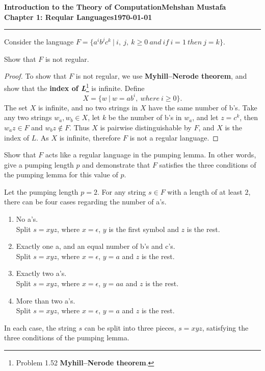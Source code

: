 \documentclass[11pt]{article}
\newcommand{\myname}{Mehshan Mustafa}
\newcommand{\dated}{\today}
\newenvironment{problem}[2][Problem]{\begin{trivlist}
\item[\hskip \labelsep {\bfseries #1}\hskip \labelsep {\bfseries #2.}]}{\end{trivlist}}
\begin{document}
\textbf{Introduction to the Theory of
Computation}\hfill\textbf{\myname}\\[0.01in]
\textbf{Chapter 1: Reqular Languages}\hfill\textbf{\dated}\\
\smallskip\hrule\bigskip

\begin{problem}{1.54}
Consider the language $F = \{a^{i}b^{j}c^{k} \ | \ i, \ j, \ k \geq 0 \ and \ if \ i = 1 \ then \ j = k\}$.
\end{problem}

\begin{problem}[Part]{a}
Show that $F$ is not regular.
\end{problem}
\begin{proof}
To show that $F$ is not regular, we use \textbf{Myhill–Nerode theorem}, and show that the \textbf{index of \textit{L}}\footnote{Problem 1.52 \textbf{Myhill–Nerode theorem}.} is infinite. Define
\[ X = \{w \ | \ w = ab^{i}, \ where \ i \geq 0 \}. \]
The set $X$ is infinite, and no two strings in $X$ have the same number of b's. Take any two strings $w_{a}, w_{b} \in X$, let $k$ be the number of b's in $w_{a}$, and let $z = c^{k}$, then $w_{a}z \in F$ and $w_{b}z \notin F$. Thus $X$ is pairwise distinguishable by $F$, and $X$ is the index of $L$. As $X$ is infinite, therefore $F$ is not a regular language.
\end{proof}

\begin{problem}[Part]{b}
Show that $F$ acts like a regular language in the pumping lemma. In other
words, give a pumping length $p$ and demonstrate that $F$ satisfies the three conditions of the pumping lemma for this value of $p$.
\end{problem}
Let the pumping length $p=2$. For any string $s \in F$ with a length of at least $2$, there can be four cases regarding the number of a's.
\begin{enumerate}
\item No a's. \\
Split $s = xyz$, where $x = \epsilon$, $y$ is the first symbol and $z$ is the rest.
\item Exactly one a, and an equal number of b's and c's. \\
Split $s = xyz$, where $x = \epsilon$, $y = a$ and $z$ is the rest.
\item Exactly two a's. \\
Split $s = xyz$, where $x = \epsilon$, $y=aa$ and $z$ is the rest.
\item More than two a's. \\
Split $s = xyz$, where $x = \epsilon$, $y=a$ and $z$ is the rest.
\end{enumerate}
In each case, the string $s$ can be split into three pieces, $s = xyz$, satisfying the three conditions of the pumping lemma.
\end{document}
